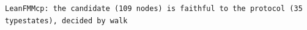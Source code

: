 \begin{lstlisting}[language={},basicstyle=\ttfamily\footnotesize,breaklines=true]
LeanFMMcp: the candidate (109 nodes) is faithful to the protocol (35 typestates), decided by walk
\end{lstlisting}
